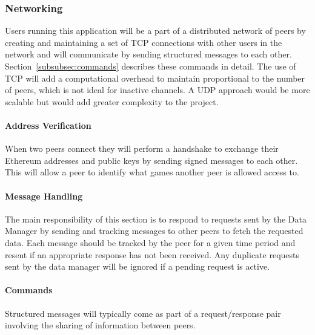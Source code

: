 \subsubsection{Networking}

Users running this application will be a part of a distributed network of peers by creating and maintaining a set of TCP connections with other users in the network and will communicate by sending structured messages to each other. Section~\ref{subsubsec:commands} describes these commands in detail.
\x
The use of TCP will add a computational overhead to maintain proportional to the number of peers, which is not ideal for inactive channels. A UDP approach would be more scalable but would add greater complexity to the project.

\paragraph*{Address Verification}
When two peers connect they will perform a handshake to exchange their Ethereum addresses and public keys by sending signed messages to each other. This will allow a peer to identify what games another peer is allowed access to.

\paragraph*{Message Handling}

The main responsibility of this section is to respond to requests sent by the Data Manager by sending and tracking messages to other peers to fetch the requested data. Each message should be tracked by the peer for a given time period and resent if an appropriate response has not been received. Any duplicate requests sent by the data manager will be ignored if a pending request is active. 

\paragraph*{Commands}\label{subsubsec:commands}

Structured messages will typically come as part of a request/response pair involving the sharing of information between peers.

